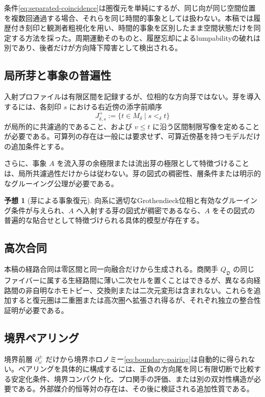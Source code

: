 \documentclass[a4paper,11pt]{ltjsarticle}
\theoremstyle{definition}
\newtheorem{conjecture}[definition]{予想}
\theoremstyle{plain}
\begin{document}
条件\eqref{eq:separated-coincidence}は圏復元を単純にするが、同じ向が同じ空間位置を複数回通過する場合、それらを同じ時間的事象としては扱わない。本稿では履歴付き刻印と観測者粗視化を用い、時間的事象を区別したまま空間状態だけを同定する方法を採った。周期運動そのものと、履歴忘却によるlumpabilityの破れは別であり、後者だけが方向降下障害として検出される。

\subsection{局所芽と事象の普遍性}

入射プロファイルは有限区間を記録するが、位相的な方向芽ではない。芽を導入するには、各刻印 $s$ における右近傍の添字前順序
\[
 J^+_{\delta,s}
 :=\{t\in M_\delta\mid s<_\delta t\}
\]
が局所的に共濾過的であること、および $v\leq t$ に沿う区間制限写像を定めることが必要である。可算列の存在は一般には要求せず、可算近傍基を持つモデルだけの追加条件とする。

さらに、事象 $A$ を流入芽の余極限または流出芽の極限として特徴づけることは、局所共濾過性だけからは従わない。芽の図式の稠密性、層条件または明示的なグルーイング公理が必要である。

\begin{conjecture}[芽による事象復元]
向系に適切なGrothendieck位相と有効なグルーイング条件が与えられ、$A$ へ入射する芽の図式が稠密であるなら、$A$ をその図式の普遍的な貼合せとして特徴づけられる具体的模型が存在する。
\end{conjecture}

\subsection{高次合同}

本稿の経路合同は零区間と同一向融合だけから生成される。商関手 $Q_{\mathfrak D}$ の同じファイバーに属する生経路間に薄い二次セルを置くことはできるが、異なる向経路間の非自明なホモトピー、交換則または二次元変形は含まれない。これらを追加すると復元圏は二重圏または高次圏へ拡張され得るが、それぞれ独立の整合性証明が必要である。

\subsection{境界ペアリング}

境界前層 $\partial_\omega^\pm$ だけから境界ホロノミー\eqref{eq:boundary-pairing}は自動的に得られない。ペアリングを具体的に構成するには、正負の方向尾を同じ有限切断で比較する安定化条件、境界コンパクト化、プロ関手の評価、または別の双対性構造が必要である。外部媒介的恒等対の存在は、その後に検証される追加性質である。
\end{document}
